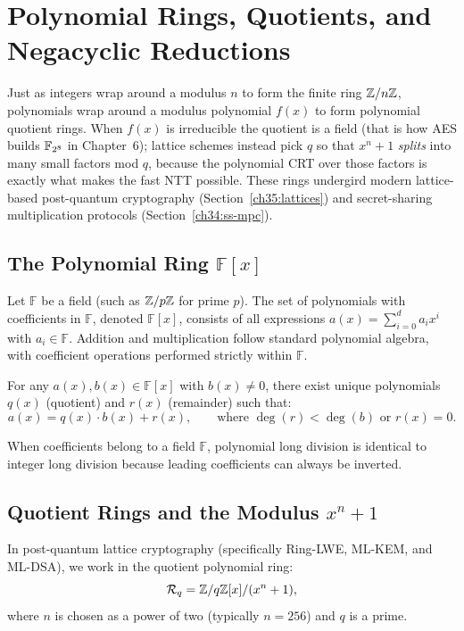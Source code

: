 \section{Polynomial Rings, Quotients, and Negacyclic Reductions}
\label{ch40:poly-rings}

Just as integers wrap around a modulus $n$ to form the finite ring $\mathbb{Z}/n\mathbb{Z}$, polynomials
wrap around a modulus polynomial $f(x)$ to form polynomial quotient rings. When $f(x)$ is
irreducible the quotient is a field (that is how AES builds $\mathbb{F}_{2^8}$ in Chapter~6); lattice
schemes instead pick $q$ so that $x^n+1$ \emph{splits} into many small factors mod $q$, because
the polynomial CRT over those factors is exactly what makes the fast NTT possible.
These rings undergird modern lattice-based post-quantum cryptography (Section~\ref{ch35:lattices})
and secret-sharing multiplication protocols (Section~\ref{ch34:ss-mpc}).

\subsection{The Polynomial Ring $\mathbb{F}[x]$}
\label{ch40:poly-ring-def}

Let $\mathbb{F}$ be a field (such as $\mathbb{Z}/p\mathbb{Z}$ for prime $p$). The set of polynomials with
coefficients in $\mathbb{F}$, denoted $\mathbb{F}[x]$, consists of all expressions
$a(x) = \sum_{i=0}^d a_i x^i$ with $a_i \in \mathbb{F}$. Addition and multiplication follow
standard polynomial algebra, with coefficient operations performed strictly within $\mathbb{F}$.

\begin{theorem}
\label{ch40:thm-poly-div}
For any $a(x), b(x) \in \mathbb{F}[x]$ with $b(x) \ne 0$, there exist unique polynomials
$q(x)$ (quotient) and $r(x)$ (remainder) such that:
\[
  a(x) = q(x) \cdot b(x) + r(x), \qquad \text{where } \deg(r) < \deg(b) \text{ or } r(x) = 0.
\]
\end{theorem}

When coefficients belong to a field $\mathbb{F}$, polynomial long division is identical to
integer long division because leading coefficients can always be inverted.

\subsection{Quotient Rings and the Modulus $x^n+1$}
\label{ch40:poly-quotients}

In post-quantum lattice cryptography (specifically Ring-LWE, ML-KEM, and ML-DSA), we work in
the quotient polynomial ring:
\[
  \mathcal{R}_q = \mathbb{Z}/q\mathbb{Z}[x] / (x^n + 1),
\]
where $n$ is chosen as a power of two (typically $n = 256$) and $q$ is a prime.

